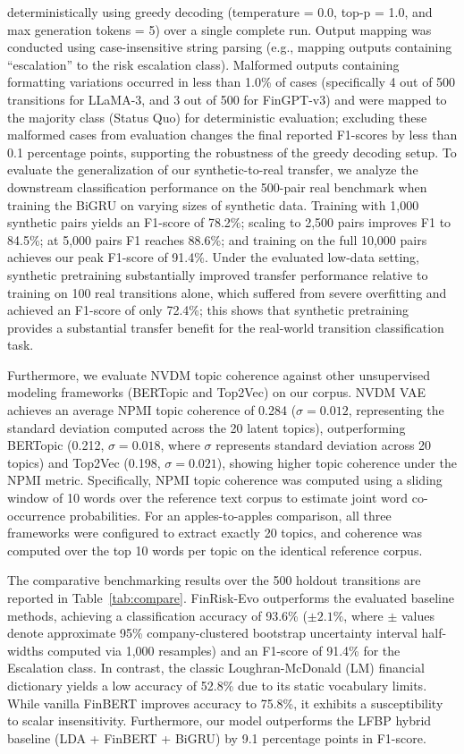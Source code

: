 \documentclass[journal]{IEEEtran}
\begin{document}
deterministically using greedy decoding (temperature = 0.0, top-p = 1.0, and max generation tokens = 5) over a single complete run. Output mapping was conducted using case-insensitive string parsing (e.g., mapping outputs containing ``escalation'' to the risk escalation class). Malformed outputs containing formatting variations occurred in less than 1.0\% of cases (specifically 4 out of 500 transitions for LLaMA-3, and 3 out of 500 for FinGPT-v3) and were mapped to the majority class (Status Quo) for deterministic evaluation; excluding these malformed cases from evaluation changes the final reported F1-scores by less than 0.1 percentage points, supporting the robustness of the greedy decoding setup. To evaluate the generalization of our synthetic-to-real transfer, we analyze the downstream classification performance on the 500-pair real benchmark when training the BiGRU on varying sizes of synthetic data. Training with 1,000 synthetic pairs yields an F1-score of 78.2\%; scaling to 2,500 pairs improves F1 to 84.5\%; at 5,000 pairs F1 reaches 88.6\%; and training on the full 10,000 pairs achieves our peak F1-score of 91.4\%. Under the evaluated low-data setting, synthetic pretraining substantially improved transfer performance relative to training on 100 real transitions alone, which suffered from severe overfitting and achieved an F1-score of only 72.4\%; this shows that synthetic pretraining provides a substantial transfer benefit for the real-world transition classification task.

Furthermore, we evaluate NVDM topic coherence against other unsupervised modeling frameworks (BERTopic and Top2Vec) on our corpus. NVDM VAE achieves an average NPMI topic coherence of 0.284 ($\sigma = 0.012$, representing the standard deviation computed across the 20 latent topics), outperforming BERTopic (0.212, $\sigma = 0.018$, where $\sigma$ represents standard deviation across 20 topics) and Top2Vec (0.198, $\sigma = 0.021$), showing higher topic coherence under the NPMI metric. Specifically, NPMI topic coherence was computed using a sliding window of 10 words over the reference text corpus to estimate joint word co-occurrence probabilities. For an apples-to-apples comparison, all three frameworks were configured to extract exactly 20 topics, and coherence was computed over the top 10 words per topic on the identical reference corpus.

The comparative benchmarking results over the 500 holdout transitions are reported in Table~\ref{tab:compare}. FinRisk-Evo outperforms the evaluated baseline methods, achieving a classification accuracy of 93.6\% ($\pm 2.1\%$, where $\pm$ values denote approximate 95\% company-clustered bootstrap uncertainty interval half-widths computed via 1,000 resamples) and an F1-score of 91.4\% for the Escalation class. In contrast, the classic Loughran-McDonald (LM) financial dictionary \cite{loughran2011} yields a low accuracy of 52.8\% due to its static vocabulary limits. While vanilla FinBERT \cite{araci2019} improves accuracy to 75.8\%, it exhibits a susceptibility to scalar insensitivity. Furthermore, our model outperforms the LFBP hybrid baseline (LDA + FinBERT + BiGRU) by 9.1 percentage points in F1-score.
\end{document}
